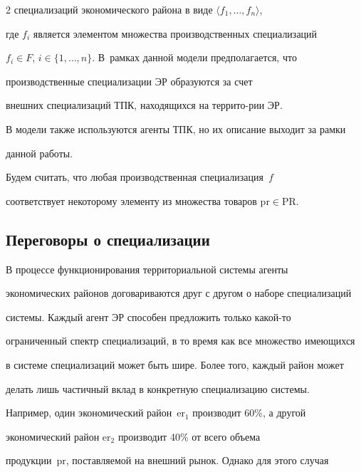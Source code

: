 \begin{multicols}{2}
специализаций экономического района в виде $\langle f_1, \ldots , f_n\rangle$, 


где $f_i$ является элементом множества производственных специализаций 


$f_i\in F$, $i\in \{1, \ldots , n\}$. В~рамках данной модели предполагается, что 


производственные специализации ЭР образуются за счет 


внешних специализаций ТПК, находящихся на террито-\linebreak рии ЭР.


  


  В модели также используются агенты ТПК, но их описание выходит за рамки 


данной работы.


  


  Будем считать, что любая производственная специализация~$f$ 


соответствует некоторому элементу из множества товаров $\mathrm{pr}\in \mathrm{PR}$.





\subsection{Переговоры о специализации}





  В процессе функционирования территориальной системы агенты 


экономических районов договариваются друг с другом о наборе специализаций 


системы. Каждый агент ЭР способен предложить только какой-то 


ограниченный спектр специализаций, в то время как все множество имеющихся 


в сис\-те\-ме специализаций может быть шире. Более того, каждый район может 


делать лишь частичный вклад в конкретную специализацию сис\-те\-мы. 


Например, один экономический район~$\mathrm{er}_1$ производит 60\%, а другой 


экономический район $\mathrm{er}_2$ производит 40\% от всего объема 


продукции~pr, поставляемой на внешний рынок. Однако для этого случая 



\end{multicols}
